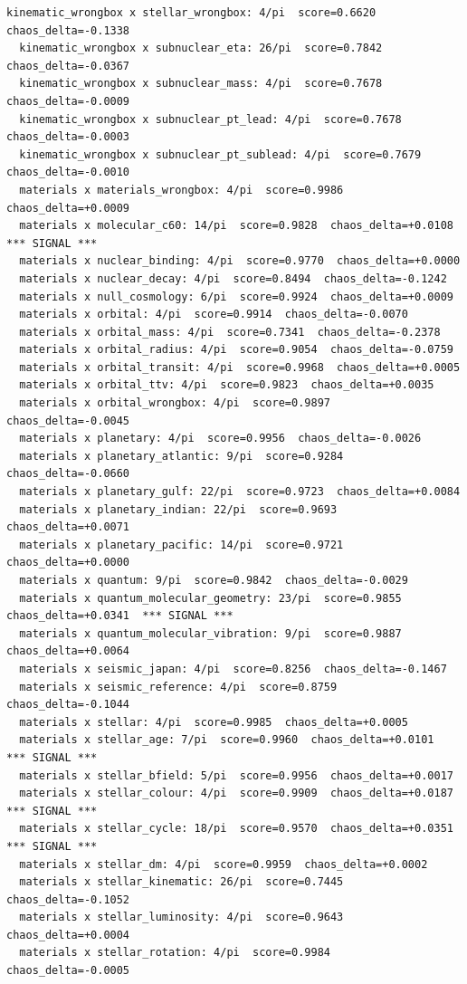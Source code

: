 \documentclass[11pt, letterpaper, openany]{book}
\begin{document}
\begin{empiricalbox}
\begin{lstlisting}[style=terminal]
  kinematic_wrongbox x stellar_wrongbox: 4/pi  score=0.6620  chaos_delta=-0.1338
  kinematic_wrongbox x subnuclear_eta: 26/pi  score=0.7842  chaos_delta=-0.0367
  kinematic_wrongbox x subnuclear_mass: 4/pi  score=0.7678  chaos_delta=-0.0009
  kinematic_wrongbox x subnuclear_pt_lead: 4/pi  score=0.7678  chaos_delta=-0.0003
  kinematic_wrongbox x subnuclear_pt_sublead: 4/pi  score=0.7679  chaos_delta=-0.0010
  materials x materials_wrongbox: 4/pi  score=0.9986  chaos_delta=+0.0009
  materials x molecular_c60: 14/pi  score=0.9828  chaos_delta=+0.0108  *** SIGNAL ***
  materials x nuclear_binding: 4/pi  score=0.9770  chaos_delta=+0.0000
  materials x nuclear_decay: 4/pi  score=0.8494  chaos_delta=-0.1242
  materials x null_cosmology: 6/pi  score=0.9924  chaos_delta=+0.0009
  materials x orbital: 4/pi  score=0.9914  chaos_delta=-0.0070
  materials x orbital_mass: 4/pi  score=0.7341  chaos_delta=-0.2378
  materials x orbital_radius: 4/pi  score=0.9054  chaos_delta=-0.0759
  materials x orbital_transit: 4/pi  score=0.9968  chaos_delta=+0.0005
  materials x orbital_ttv: 4/pi  score=0.9823  chaos_delta=+0.0035
  materials x orbital_wrongbox: 4/pi  score=0.9897  chaos_delta=-0.0045
  materials x planetary: 4/pi  score=0.9956  chaos_delta=-0.0026
  materials x planetary_atlantic: 9/pi  score=0.9284  chaos_delta=-0.0660
  materials x planetary_gulf: 22/pi  score=0.9723  chaos_delta=+0.0084
  materials x planetary_indian: 22/pi  score=0.9693  chaos_delta=+0.0071
  materials x planetary_pacific: 14/pi  score=0.9721  chaos_delta=+0.0000
  materials x quantum: 9/pi  score=0.9842  chaos_delta=-0.0029
  materials x quantum_molecular_geometry: 23/pi  score=0.9855  chaos_delta=+0.0341  *** SIGNAL ***
  materials x quantum_molecular_vibration: 9/pi  score=0.9887  chaos_delta=+0.0064
  materials x seismic_japan: 4/pi  score=0.8256  chaos_delta=-0.1467
  materials x seismic_reference: 4/pi  score=0.8759  chaos_delta=-0.1044
  materials x stellar: 4/pi  score=0.9985  chaos_delta=+0.0005
  materials x stellar_age: 7/pi  score=0.9960  chaos_delta=+0.0101  *** SIGNAL ***
  materials x stellar_bfield: 5/pi  score=0.9956  chaos_delta=+0.0017
  materials x stellar_colour: 4/pi  score=0.9909  chaos_delta=+0.0187  *** SIGNAL ***
  materials x stellar_cycle: 18/pi  score=0.9570  chaos_delta=+0.0351  *** SIGNAL ***
  materials x stellar_dm: 4/pi  score=0.9959  chaos_delta=+0.0002
  materials x stellar_kinematic: 26/pi  score=0.7445  chaos_delta=-0.1052
  materials x stellar_luminosity: 4/pi  score=0.9643  chaos_delta=+0.0004
  materials x stellar_rotation: 4/pi  score=0.9984  chaos_delta=-0.0005

\end{lstlisting}
\end{empiricalbox}
\end{document}
